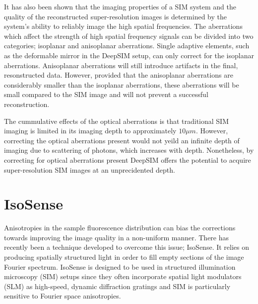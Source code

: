 It has also been shown that the imaging properties of a SIM
system and the quality of the reconstructed super-resolution
images is determined by the system's ability to reliably
image the high spatial frequencies.\cite{debarre2008adaptive,thomas2015enhanced}
The aberrations which affect the strength of high spatial 
frequency signals can be divided into two categories; 
isoplanar and anisoplanar aberrations. Single adaptive 
elements, such as the deformable mirror in the DeepSIM 
setup, can only correct for the isoplanar aberrations.
Anisoplanar aberrations will still introduce artifacts 
in the final, resonstructed data. However, provided that
the anisoplanar aberrations are considerably smaller than
the isoplanar aberrations, these aberrations will be small
compared to the SIM image and will not prevent a successful
reconstruction.\cite{thomas2015enhanced}

The cummulative effects of the optical aberrations is that
traditional SIM imaging is limited in its imaging depth to
approximately $10\mu m$.\cite{wu2018faster} However, 
correcting the optical aberrations present would not yeild
an infinite depth of imaging due to scattering of photons,
which increases with depth. Nonetheless, by correcting for
optical aberrations present DeepSIM offers the potential to 
acquire super-resolution SIM images at an unprecidented depth.

\section{IsoSense}
\label{sec:isosense}

Anisotropies in the sample fluorescence distribution can bias 
the corrections towards improving the image quality in a 
non-uniform manner. There has recently been a technique developed 
to overcome  this issue; IsoSense\cite{vzurauskas2019isosense}. 
It relies  on producing spatially structured light in order to fill 
empty sections of the image Fourier spectrum. IsoSense is designed 
to be used in structured illumination microscopy (SIM) setups since 
they often incorporate spatial light modulators (SLM) as high-speed, 
dynamic diffraction  gratings and SIM is particularly sensitive to 
Fourier space anisotropies.

